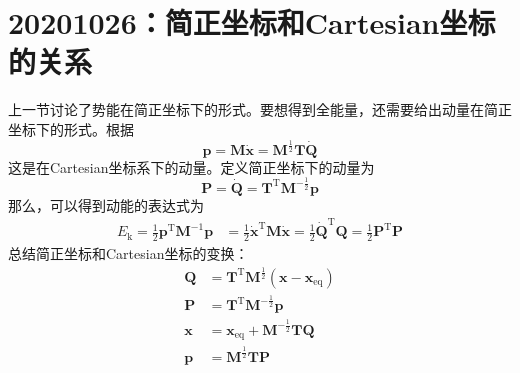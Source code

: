 \documentclass[12pt]{article}
\begin{document}
\section{20201026：简正坐标和Cartesian坐标的关系}

    上一节讨论了势能在简正坐标下的形式。要想得到全能量，还需要给出动量在简正坐标下的形式。根据
    \begin{equation}
        \bm{p} = \bm{M\dot{x}} = \bm{M}^{\frac 12} \bm{T\dot{Q}}
    \end{equation}
    这是在Cartesian坐标系下的动量。定义简正坐标下的动量为
    \begin{equation}
        \bm{P = \dot{Q}} = \bm{T}^\mathrm{T} \bm{M}^{-\frac 12} \bm{p}
    \end{equation}
    那么，可以得到动能的表达式为
    \begin{equation}\begin{aligned}
        E_\mathrm{k} = \frac 12 \bm{p}^{\mathrm{T}} \bm{M}^{-1} \bm{p} &= \frac 12 \bm{\dot{x}}^\mathrm{T}\bm{M\dot{x}}
        = \frac 12 \bm{\dot{Q}}^\mathrm{T} \bm{Q}
        = \frac 12 \bm{P}^{\mathrm{T}} \bm{P}
    \end{aligned}\end{equation}
    总结简正坐标和Cartesian坐标的变换：
    \begin{equation}\begin{aligned}
        \bm{Q} &= \bm{T}^\mathrm{T} \bm{M}^{\frac 12} (\bm{x-x}_\mathrm{eq})\\
        \bm{P} &= \bm{T}^\mathrm{T} \bm{M}^{-\frac 12} \bm{p}\\
        \bm{x} &= \bm{x}_\mathrm{eq} + \bm{M}^{-\frac 12}\bm{TQ}\\
        \bm{p} &= \bm{M}^{\frac 12}\bm{TP}
    \end{aligned}\end{equation}
\end{document}
